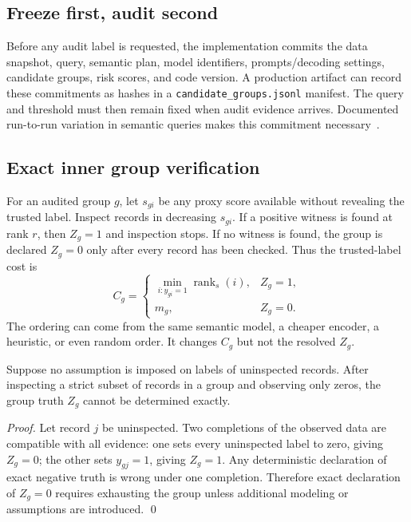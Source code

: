 \documentclass[runningheads]{llncs}
\begin{document}
\subsection{Freeze first, audit second}
Before any audit label is requested, the implementation commits the data snapshot, query, semantic plan, model identifiers, prompts/decoding settings, candidate groups, risk scores, and code version. A production artifact can record these commitments as hashes in a \texttt{candidate\_groups.jsonl} manifest. The query and threshold must then remain fixed when audit evidence arrives. Documented run-to-run variation in semantic queries makes this commitment necessary~\cite{variance2026}.

\subsection{Exact inner group verification}
For an audited group $g$, let $s_{gi}$ be any proxy score available without revealing the trusted label. Inspect records in decreasing $s_{gi}$. If a positive witness is found at rank $r$, then $Z_g=1$ and inspection stops. If no witness is found, the group is declared $Z_g=0$ only after every record has been checked. Thus the trusted-label cost is
\begin{equation}
C_g=\begin{cases}
\min_{i:y_{gi}=1}\operatorname{rank}_s(i), & Z_g=1,\\
m_g, & Z_g=0.
\end{cases}
\label{eq:innercost}
\end{equation}
The ordering can come from the same semantic model, a cheaper encoder, a heuristic, or even random order. It changes $C_g$ but not the resolved $Z_g$.

\begin{proposition}
Suppose no assumption is imposed on labels of uninspected records. After inspecting a strict subset of records in a group and observing only zeros, the group truth $Z_g$ cannot be determined exactly.
\end{proposition}
\begin{proof}
Let record $j$ be uninspected. Two completions of the observed data are compatible with all evidence: one sets every uninspected label to zero, giving $Z_g=0$; the other sets $y_{gj}=1$, giving $Z_g=1$. Any deterministic declaration of exact negative truth is wrong under one completion. Therefore exact declaration of $Z_g=0$ requires exhausting the group unless additional modeling or assumptions are introduced. \qed
\end{proof}
\end{document}
